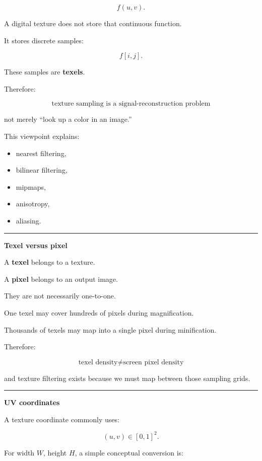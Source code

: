\[
f(u,v).
\]

A digital texture does not store that continuous function.

It stores discrete samples:

\[
f[i,j].
\]

These samples are \textbf{texels}.

Therefore:

\[
\boxed{
\text{texture sampling is a signal-reconstruction problem}
}
\]

not merely ``look up a color in an image.''

This viewpoint explains:

\begin{itemize}
\tightlist
\item
  nearest filtering,
\item
  bilinear filtering,
\item
  mipmaps,
\item
  anisotropy,
\item
  aliasing.
\end{itemize}

\begin{center}\rule{0.5\linewidth}{0.5pt}\end{center}

\textbf{Texel versus pixel}

A \textbf{texel} belongs to a texture.

A \textbf{pixel} belongs to an output image.

They are not necessarily one-to-one.

One texel may cover hundreds of pixels during magnification.

Thousands of texels may map into a single pixel during minification.

Therefore:

\[
\boxed{
\text{texel density}
\neq
\text{screen pixel density}
}
\]

and texture filtering exists because we must map between those sampling grids.

\begin{center}\rule{0.5\linewidth}{0.5pt}\end{center}

\textbf{UV coordinates}

A texture coordinate commonly uses:

\[
(u,v)\in[0,1]^2.
\]

For width \(W\), height \(H\), a simple conceptual conversion is:

